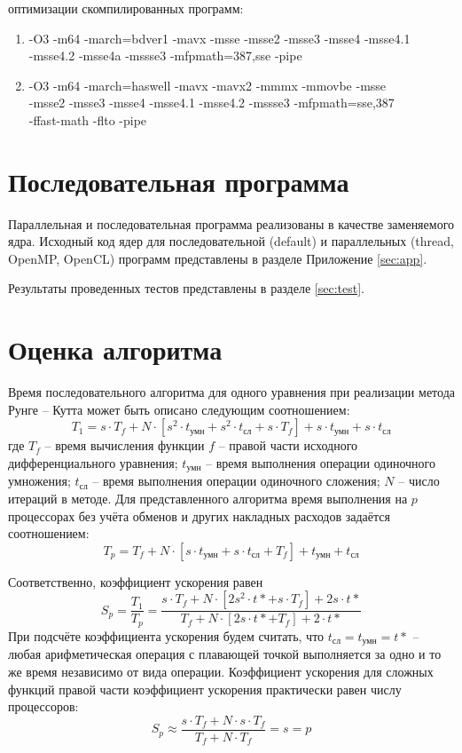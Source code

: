 \documentclass[14pt,final,titlepage,pscyr]{hedwork}
\begin{document}
 оптимизации скомпилированных программ:
\begin{enumerate}
	\item -O3 -m64 -march=bdver1 -mavx -msse -msse2 -msse3 -msse4 -msse4.1 \\
		-msse4.2 -msse4a -mssse3 -mfpmath=387,sse -pipe
	\item -O3 -m64 -march=haswell -mavx -mavx2 -mmmx -mmovbe -msse \\
		-msse2 -msse3 -msse4 -msse4.1 -msse4.2 -mssse3 -mfpmath=sse,387 \\
		-ffast-math -flto -pipe
\end{enumerate}

\newpage

\section{Последовательная программа}
Параллельная и последовательная программа реализованы в качестве заменяемого ядра. Исходный код ядер для 
последовательной (default) и параллельных (thread, OpenMP, OpenCL) программ представлены в разделе 
Приложение \eqref{sec:app}.

Результаты проведенных тестов представлены в разделе \ref{sec:test}. 

\section{Оценка алгоритма}
Время последовательного алгоритма для одного уравнения при реализации метода Рунге -- Кутта может быть 
описано следующим соотношением:
\[
	T_1 = s\cdot T_f + N \cdot \left[ s^2 \cdot t_\text{умн} + s^2 \cdot t_\text{сл} + 
		s \cdot T_f \right] + s \cdot t_\text{умн} + s \cdot t_\text{сл}
\]
где \( T_f \) -- время вычисления функции \( f \) -- правой части исходного дифференциального уравнения;
\( t_\text{умн} \) -- время выполнения операции одиночного умножения; \( t_\text{сл} \) -- время 
выполнения операции одиночного сложения; \( N \) -- число итераций в методе. Для представленного алгоритма 
время выполнения на \( p \) процессорах без учёта обменов и других накладных расходов задаётся соотношением:
\[
	T_p = T_f + N \cdot \left[ s \cdot t_\text{умн} + s \cdot t_\text{сл} + T_f \right] + 
		t_\text{умн} + t_\text{сл}
\]

Соответственно, коэффициент ускорения равен
\[
	S_p = \frac{T_1}{T_p} = \frac{s\cdot T_f + N\cdot\left[ 2s^2 \cdot t* + s\cdot T_f\right] + 2s\cdot t*}
			{T_f + N\cdot\left[ 2s\cdot t* + T_f\right] + 2\cdot t*}
\]
При подсчёте коэффициента ускорения будем считать, что \( t_\text{сл} = t_\text{умн} = t* \) -- любая 
арифметическая операция с плавающей точкой выполняется за одно и то же время независимо от вида операции.
Коэффициент ускорения для сложных функций правой части коэффициент ускорения практически равен числу 
процессоров:
\[
	S_p \approx \frac{s \cdot T_f + N \cdot s \cdot T_f}{T_f + N \cdot T_f } = s = p
\]
\end{document}
